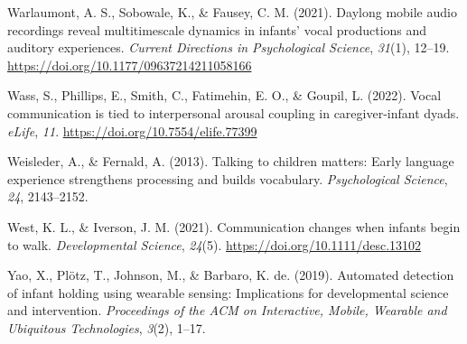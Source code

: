 \documentclass[
  man]{apa6}
\newlength{\cslhangindent}
\newlength{\cslentryspacingunit} %
\newenvironment{CSLReferences}[2] %
 {%
  \setlength{\parindent}{0pt}
  \ifodd #1
  \let\oldpar\par
  \def\par{\hangindent=\cslhangindent\oldpar}
  \fi
  \setlength{\parskip}{#2\cslentryspacingunit}
 }%
 {}
\begin{document}
\begin{CSLReferences}{1}{0}
\leavevmode{}%
Warlaumont, A. S., Sobowale, K., \& Fausey, C. M. (2021). Daylong mobile audio recordings reveal multitimescale dynamics in infants' vocal productions and auditory experiences. \emph{Current Directions in Psychological Science}, \emph{31}(1), 12--19. \url{https://doi.org/10.1177/09637214211058166}

\leavevmode{}%
Wass, S., Phillips, E., Smith, C., Fatimehin, E. O., \& Goupil, L. (2022). Vocal communication is tied to interpersonal arousal coupling in caregiver-infant dyads. \emph{{eLife}}, \emph{11}. \url{https://doi.org/10.7554/elife.77399}

\leavevmode{}%
Weisleder, A., \& Fernald, A. (2013). Talking to children matters: Early language experience strengthens processing and builds vocabulary. \emph{Psychological Science}, \emph{24}, 2143--2152.

\leavevmode{}%
West, K. L., \& Iverson, J. M. (2021). Communication changes when infants begin to walk. \emph{Developmental Science}, \emph{24}(5). \url{https://doi.org/10.1111/desc.13102}

\leavevmode{}%
Yao, X., Plötz, T., Johnson, M., \& Barbaro, K. de. (2019). Automated detection of infant holding using wearable sensing: Implications for developmental science and intervention. \emph{Proceedings of the ACM on Interactive, Mobile, Wearable and Ubiquitous Technologies}, \emph{3}(2), 1--17.

\end{CSLReferences}
\end{document}
